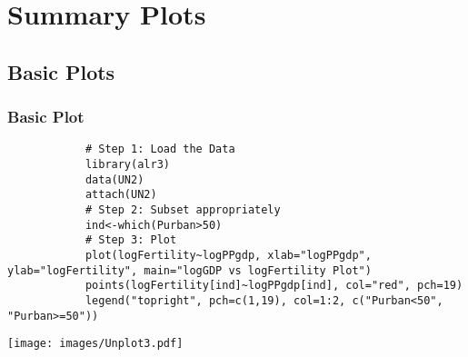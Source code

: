 

\section[Summary Plots]{Summary Plots}

\subsection{Basic Plots}
\begin{frame}
  \frametitle{Basic Plot}
      
      		\begin{lstlisting}
			# Step 1: Load the Data
			library(alr3)
			data(UN2)
			attach(UN2)
			# Step 2: Subset appropriately
			ind<-which(Purban>50)
			# Step 3: Plot		
			plot(logFertility~logPPgdp, xlab="logPPgdp", ylab="logFertility", main="logGDP vs logFertility Plot")
			points(logFertility[ind]~logPPgdp[ind], col="red", pch=19)
			legend("topright", pch=c(1,19), col=1:2, c("Purban<50", "Purban>=50"))
		\end{lstlisting}
%
\newpage
       \begin{center}
         \texttt{[image: images/Unplot3.pdf]}
        \end{center}


\end{frame}

